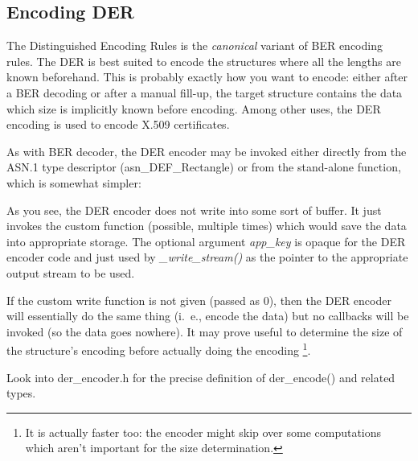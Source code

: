 \documentclass[english,oneside,12pt]{book}
\begin{document}
\subsection{\label{sub:Encoding-DER}Encoding DER}

The Distinguished Encoding Rules is the \emph{canonical} variant of
BER encoding rules. The DER is best suited to encode the structures
where all the lengths are known beforehand. This is probably exactly
how you want to encode: either after a BER decoding or after a manual
fill-up, the target structure contains the data which size is implicitly
known before encoding. Among other uses, the DER encoding is used
to encode X.509 certificates.

As with BER decoder, the DER encoder may be invoked either directly
from the ASN.1 type descriptor (asn\_DEF\_Rectangle) or from the stand-alone
function, which is somewhat simpler:
As you see, the DER encoder does not write into some sort of buffer.
It just invokes the custom function (possible, multiple
times) which would save the data into appropriate storage. The optional
argument \emph{app\_key} is opaque for the DER encoder code and just
used by \emph{\_write\_stream()} as the pointer to the appropriate
output stream to be used.

If the custom write function is not given (passed as 0), then the
DER encoder will essentially do the same thing (i.~e., encode the data)
but no callbacks will be invoked (so the data goes nowhere). It may
prove useful to determine the size of the structure's encoding before
actually doing the encoding%
\footnote{It is actually faster too: the encoder might skip over some computations
which aren't important for the size determination.%
}.

Look into der\_encoder.h for the precise definition of der\_encode()
and related types.
\end{document}
